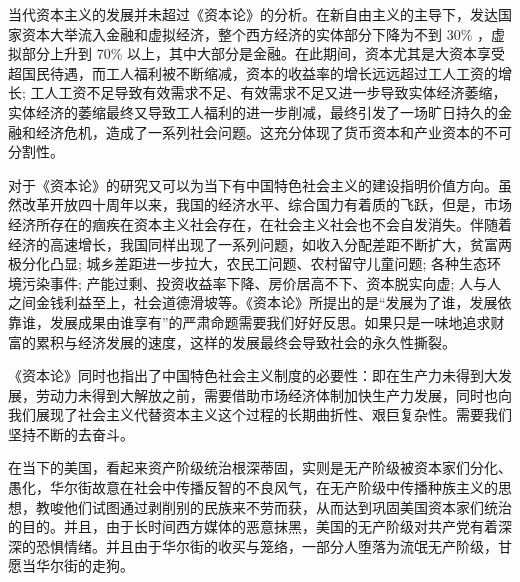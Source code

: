 \documentclass[utf8]{ctexart}
\begin{document}
	当代资本主义的发展并未超过《资本论》的分析。在新自由主义的主导下，发达国家资本大举流入金融和虚拟经济，整个西方经济的实体部分下降为不到 30\% ，虚拟部分上升到 70\% 以上，其中大部分是金融。在此期间，资本尤其是大资本享受超国民待遇，而工人福利被不断缩减，资本的收益率的增长远远超过工人工资的增长; 工人工资不足导致有效需求不足、有效需求不足又进一步导致实体经济萎缩，实体经济的萎缩最终又导致工人福利的进一步削减，最终引发了一场旷日持久的金融和经济危机，造成了一系列社会问题。这充分体现了货币资本和产业资本的不可分割性。
	
	对于《资本论》的研究又可以为当下有中国特色社会主义的建设指明价值方向。虽然改革开放四十周年以来，我国的经济水平、综合国力有着质的飞跃，但是，市场经济所存在的痼疾在资本主义社会存在，在社会主义社会也不会自发消失。伴随着经济的高速增长，我国同样出现了一系列问题，如收入分配差距不断扩大，贫富两极分化凸显; 城乡差距进一步拉大，农民工问题、农村留守儿童问题; 各种生态环境污染事件; 产能过剩、投资收益率下降、房价居高不下、资本脱实向虚; 人与人之间金钱利益至上，社会道德滑坡等。《资本论》所提出的是“发展为了谁，发展依靠谁，发展成果由谁享有”的严肃命题需要我们好好反思。如果只是一味地追求财富的累积与经济发展的速度，这样的发展最终会导致社会的永久性撕裂。
	
	《资本论》同时也指出了中国特色社会主义制度的必要性：即在生产力未得到大发展，劳动力未得到大解放之前，需要借助市场经济体制加快生产力发展，同时也向我们展现了社会主义代替资本主义这个过程的长期曲折性、艰巨复杂性。需要我们坚持不断的去奋斗。
	
	在当下的美国，看起来资产阶级统治根深蒂固，实则是无产阶级被资本家们分化、愚化，华尔街故意在社会中传播反智的不良风气，在无产阶级中传播种族主义的思想，教唆他们试图通过剥削别的民族来不劳而获，从而达到巩固美国资本家们统治的目的。并且，由于长时间西方媒体的恶意抹黑，美国的无产阶级对共产党有着深深的恐惧情绪。并且由于华尔街的收买与笼络，一部分人堕落为流氓无产阶级，甘愿当华尔街的走狗。
	
	
\end{document}
